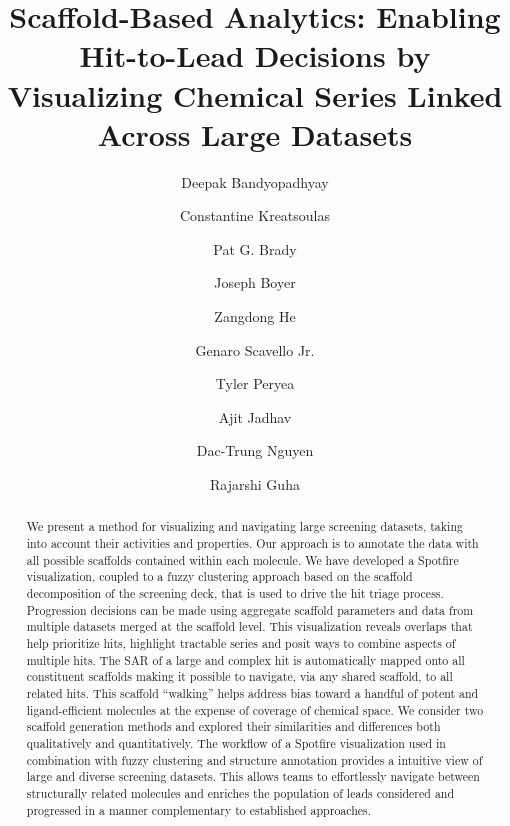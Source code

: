 \documentclass[journal=jacsat,biochem,manuscript=article]{achemso}
\author{Deepak Bandyopadhyay}
\author{Constantine Kreatsoulas}
\author{Pat G. Brady}
\author{Joseph Boyer}
\author{Zangdong He}
\author{Genaro Scavello Jr.}
\affiliation[GSK]{GlaxoSmithKline, 1250 S. Collegeville Rd, Collegeville, PA 19426}
\author{Tyler Peryea}
\author{Ajit Jadhav}
\author{Dac-Trung Nguyen}
\author{Rajarshi Guha}
\affiliation[NCATS]{National Center for Advancing Translational
  Science, 9800 Medical Center Drive, Rockville, MD 20850}
\title[Scaffold Analytics] {Scaffold-Based Analytics: Enabling Hit-to-Lead
  Decisions by Visualizing Chemical Series Linked Across Large Datasets}
\begin{document}






\begin{abstract}
  We present a method for visualizing and navigating large screening
  datasets, taking into account their activities and properties. Our
  approach is to annotate the data with all possible scaffolds
  contained within each molecule.  We have developed a Spotfire
  visualization, coupled to a fuzzy clustering approach based on the
  scaffold decomposition of the screening deck, that is used to drive
  the hit triage process. Progression decisions can be made using
  aggregate scaffold parameters and data from multiple datasets merged
  at the scaffold level.  This visualization reveals overlaps
  that help prioritize hits, highlight tractable series and posit ways
  to combine aspects of multiple hits.  The SAR of a large and complex
  hit is automatically mapped onto all constituent scaffolds making it
  possible to navigate, via any shared scaffold, to all related hits.
  This scaffold ``walking'' helps address bias toward a handful of
  potent and ligand-efficient molecules at the expense of coverage of
  chemical space.  We consider two scaffold generation methods and
  explored their similarities and differences both qualitatively and
  quantitatively.  The workflow of a Spotfire visualization used in
  combination with fuzzy clustering and structure annotation provides
  a intuitive view of large and diverse screening datasets. This
  allows teams to effortlessly navigate between structurally related
  molecules and enriches the population of leads considered and
  progressed in a manner complementary to established approaches.
\end{abstract}
\end{document}
